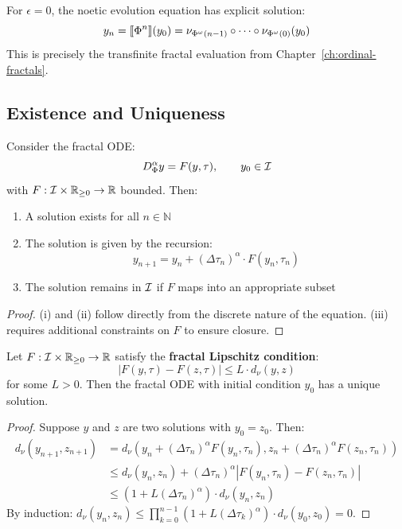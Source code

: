 \begin{proposition}
\label{prop:unperturbed-solution}
For $\epsilon = 0$, the noetic evolution equation has explicit solution:
\[
y_n = \llbracket \Phi^{n} \rrbracket(y_0) = \nu_{\Phi^{\omega}(n-1)} \circ \cdots \circ \nu_{\Phi^{\omega}(0)}(y_0)
\]
This is precisely the transfinite fractal evaluation from Chapter~\ref{ch:ordinal-fractals}.
\end{proposition}

\subsection{Existence and Uniqueness}

\begin{theorem}
\label{thm:fractal-ode-existence}
Consider the fractal ODE:
\[
D^\alpha_\Phi y = F(y, \tau), \qquad y_0 \in \mathcal{I}
\]
with $F : \mathcal{I} \times \mathbb{R}_{\geq 0} \to \mathbb{R}$ bounded. Then:
\begin{enumerate}[label=(\roman*)]
  \item A solution exists for all $n \in \mathbb{N}$
  \item The solution is given by the recursion:
  \[
  y_{n+1} = y_n + (\Delta\tau_n)^\alpha \cdot F(y_n, \tau_n)
  \]
  \item The solution remains in $\mathcal{I}$ if $F$ maps into an appropriate subset
\end{enumerate}
\end{theorem}

\begin{proof}
(i) and (ii) follow directly from the discrete nature of the equation. (iii) requires additional constraints on $F$ to ensure closure.
\end{proof}

\begin{theorem}
\label{thm:fractal-ode-uniqueness}
Let $F : \mathcal{I} \times \mathbb{R}_{\geq 0} \to \mathbb{R}$ satisfy the \textbf{fractal Lipschitz condition}:
\[
|F(y, \tau) - F(z, \tau)| \leq L \cdot d_\nu(y, z)
\]
for some $L > 0$. Then the fractal ODE with initial condition $y_0$ has a unique solution.
\end{theorem}

\begin{proof}
Suppose $y$ and $z$ are two solutions with $y_0 = z_0$. Then:
\begin{align*}
d_\nu(y_{n+1}, z_{n+1})
&= d_\nu(y_n + (\Delta\tau_n)^\alpha F(y_n, \tau_n), z_n + (\Delta\tau_n)^\alpha F(z_n, \tau_n)) \\
&\leq d_\nu(y_n, z_n) + (\Delta\tau_n)^\alpha |F(y_n, \tau_n) - F(z_n, \tau_n)| \\
&\leq (1 + L(\Delta\tau_n)^\alpha) \cdot d_\nu(y_n, z_n)
\end{align*}
By induction: $d_\nu(y_n, z_n) \leq \prod_{k=0}^{n-1}(1 + L(\Delta\tau_k)^\alpha) \cdot d_\nu(y_0, z_0) = 0$.
\end{proof}


